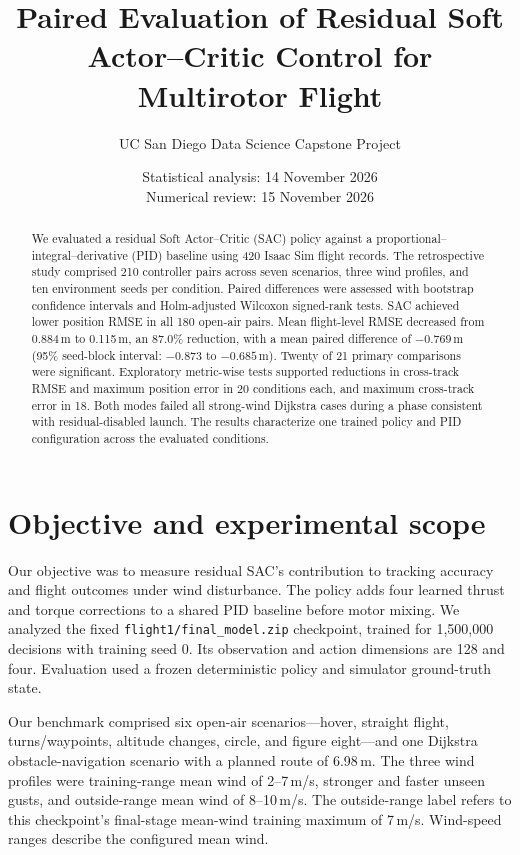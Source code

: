 \documentclass[11pt,a4paper]{article}
\title{Paired Evaluation of Residual Soft Actor--Critic Control for Multirotor Flight}
\author{UC San Diego Data Science Capstone Project}
\date{Statistical analysis: 14 November 2026\\Numerical review: 15 November 2026}
\begin{document}
\maketitle
\begin{abstract}
We evaluated a residual Soft Actor--Critic (SAC) policy against a proportional--integral--derivative (PID) baseline using 420 Isaac Sim flight records. The retrospective study comprised 210 controller pairs across seven scenarios, three wind profiles, and ten environment seeds per condition. Paired differences were assessed with bootstrap confidence intervals and Holm-adjusted Wilcoxon signed-rank tests. SAC achieved lower position RMSE in all 180 open-air pairs. Mean flight-level RMSE decreased from 0.884\,m to 0.115\,m, an 87.0\% reduction, with a mean paired difference of $-0.769$\,m (95\% seed-block interval: $-0.873$ to $-0.685$\,m). Twenty of 21 primary comparisons were significant. Exploratory metric-wise tests supported reductions in cross-track RMSE and maximum position error in 20 conditions each, and maximum cross-track error in 18. Both modes failed all strong-wind Dijkstra cases during a phase consistent with residual-disabled launch. The results characterize one trained policy and PID configuration across the evaluated conditions.
\end{abstract}

\section{Objective and experimental scope}
Our objective was to measure residual SAC's contribution to tracking accuracy and flight outcomes under wind disturbance. The policy adds four learned thrust and torque corrections to a shared PID baseline before motor mixing. We analyzed the fixed \texttt{flight1/final\_model.zip} checkpoint, trained for 1,500,000 decisions with training seed 0. Its observation and action dimensions are 128 and four. Evaluation used a frozen deterministic policy and simulator ground-truth state\cite{source}.

Our benchmark comprised six open-air scenarios---hover, straight flight, turns/waypoints, altitude changes, circle, and figure eight---and one Dijkstra obstacle-navigation scenario with a planned route of 6.98\,m. The three wind profiles were training-range mean wind of 2--7\,m/s, stronger and faster unseen gusts, and outside-range mean wind of 8--10\,m/s. The outside-range label refers to this checkpoint's final-stage mean-wind training maximum of 7\,m/s. Wind-speed ranges describe the configured mean wind.
\end{document}
